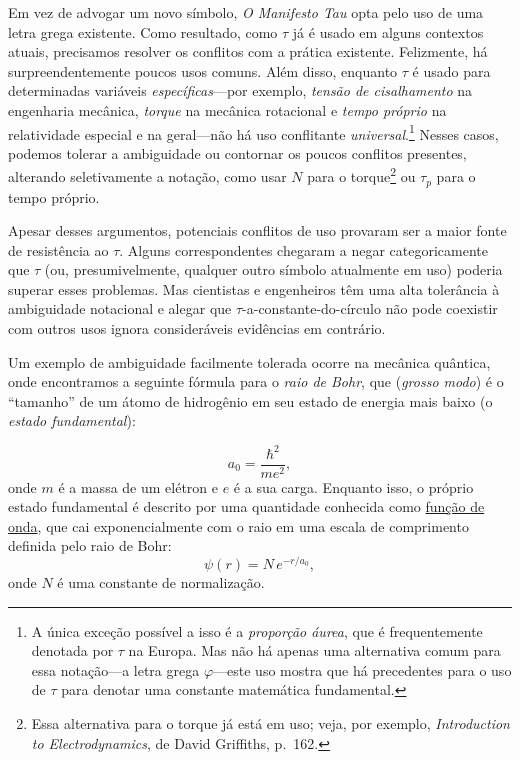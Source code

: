 {Em vez de advogar um novo símbolo, \emph{O Manifesto Tau} opta pelo uso de uma letra grega existente. Como resultado, como $\tau$ já é usado em alguns contextos atuais, precisamos resolver os conflitos com a prática existente. Felizmente, há surpreendentemente poucos usos comuns. Além disso, enquanto $\tau$ é usado para determinadas variáveis \emph{específicas}---por exemplo, \emph{tensão de cisalhamento} na engenharia mecânica, \emph{torque} na mecânica rotacional e \emph{tempo próprio} na relatividade especial e na geral---não há uso conflitante \emph{universal}.\footnote{A única exceção possível a isso é a \emph{proporção áurea}, que é frequentemente denotada por $\tau$ na Europa. Mas não há apenas uma alternativa comum para essa notação---a letra grega $\varphi$---este uso mostra que há precedentes para o uso de $\tau$ para denotar uma constante matemática fundamental.} Nesses casos, podemos tolerar a ambiguidade ou contornar os poucos conflitos presentes, alterando seletivamente a notação, como usar $N$ para o torque\footnote{Essa alternativa para o torque já está em uso; veja, por exemplo, \emph{Introduction to Electrodynamics}, de David Griffiths, p.~162.} ou $\tau_p$ para o tempo próprio.

Apesar desses argumentos, potenciais conflitos de uso provaram ser a maior fonte de resistência ao $\tau$. Alguns correspondentes chegaram a negar categoricamente que $\tau$ (ou, presumivelmente, qualquer outro símbolo atualmente em uso) poderia superar esses problemas. Mas cientistas e engenheiros têm uma alta tolerância à ambiguidade notacional e alegar que $\tau$-a-constante-do-círculo não pode coexistir com outros usos ignora consideráveis evidências ​​em contrário.

Um exemplo de ambiguidade facilmente tolerada ocorre na mecânica quântica, onde encontramos a seguinte fórmula para o \emph{raio de Bohr}, que (\emph{grosso modo}) é o ``tamanho'' de um átomo de hidrogênio em seu estado de energia mais baixo (o \emph{estado fundamental}):

\[
a_0 = \frac{\hbar^2}{m e^2},
\]
onde $m$ é a massa de um elétron e $e$ é a sua carga. Enquanto isso, o próprio estado fundamental é descrito por uma quantidade conhecida como \href{https://pt.wikipedia.org/wiki/Fun%C3%A7%C3%A3o_de_onda}{função de onda}, que cai exponencialmente com o raio em uma escala de comprimento definida pelo raio de Bohr:
\begin{equation}
\label{eq:hydrogen}
\psi(r) = N\,e^{-r/a_0},
\end{equation}
onde $N$ é uma constante de normalização.

}
